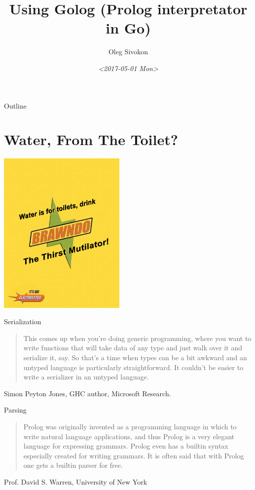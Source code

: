 \documentclass[presentation]{beamer}
\author{Oleg Sivokon}
\date{\textit{<2017-05-01 Mon>}}
\title{Using Golog (Prolog interpretator in Go)}
\begin{document}
\maketitle
\begin{frame}{Outline}
\tableofcontents
\end{frame}


\section{Water, From The Toilet?}
\label{sec-1}
\includegraphics[height=8cm]{./images/water-from-toilet.jpg}

\begin{frame}[label=sec-1-1]{Serialization}
\begin{quote}
This comes up when you're doing generic programming, where you
want to write functions that will take data of any type and just
walk over it and serialize it, say.  So that's a time when types
can be a bit awkward and an untyped language is particularly
straightforward.  It couldn't be easier to write a serializer in
an untyped language.
\end{quote}
Simon Peyton Jones, GHC author, Microsoft Research.
\end{frame}

\begin{frame}[label=sec-1-2]{Parsing}
\begin{quote}
Prolog was originally invented as a programming language in which
to write natural language applications, and thus Prolog is a very
elegant language for expressing grammars.  Prolog even has a
builtin syntax especially created for writing grammars.  It is
often said that with Prolog one gets a builtin parser for free.
\end{quote}
Prof. David S. Warren, University of New York
\end{frame}
\end{document}
